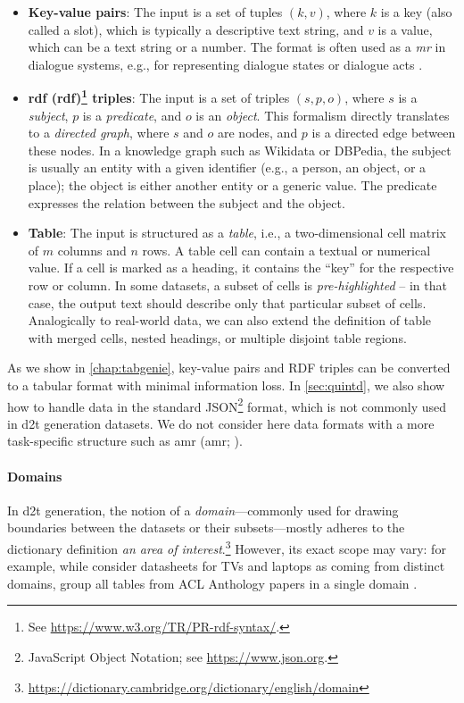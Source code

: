 {\begin{itemize}
    \item \textbf{Key-value pairs}: The input is a set of tuples $(k, v)$, where $k$ is a key (also called a slot), which is typically a descriptive text string, and $v$ is a value, which can be a text string or a number. The format is often used as a \emph{\ac{mr}} in dialogue systems, e.g., for representing dialogue states or dialogue acts \cite{rastogiScalableMultiDomainConversational2020,budzianowskiMultiWOZLargeScaleMultiDomain2020}.
    \item \textbf{\acs{rdf} (\Acl{rdf})\footnote{See \url{https://www.w3.org/TR/PR-rdf-syntax/}.} triples}: The input is a set of triples $(s, p, o)$, where $s$ is a \emph{subject},  $p$ is a \emph{predicate}, and $o$ is an \textit{object}. This formalism directly translates to a \emph{directed graph}, where $s$ and $o$ are nodes, and $p$ is a directed edge between these nodes. In a knowledge graph such as Wikidata or DBPedia, the subject is usually an entity with a given identifier (e.g., a person, an object, or a place); the object is either another entity or a generic value. The predicate expresses the relation between the subject and the object.
    \item \textbf{Table}: The input is structured as a \textit{table}, i.e., a two-dimensional cell matrix of $m$ columns and $n$ rows. A table cell can contain a textual or numerical value. If a cell is marked as a heading, it contains the ``key'' for the respective row or column. In some datasets, a subset of cells is \emph{pre-highlighted} -- in that case, the output text should describe only that particular subset of cells. Analogically to real-world data, we can also extend the definition of table with merged cells, nested headings, or multiple disjoint table regions.
\end{itemize}

As we show in \autoref{chap:tabgenie}, key-value pairs and RDF triples can be converted to a tabular format with minimal information loss. In \autoref{sec:quintd}, we also show how to handle data in the standard JSON\footnote{JavaScript Object Notation; see \url{https://www.json.org}.} format, which is not commonly used in \ac{d2t} generation datasets. We do not consider here data formats with a more task-specific structure such as \acl{amr} (\acs{amr}; \citealp{banarescu2013abstract}).

\paragraph{Domains} In \ac{d2t} generation, the notion of a \emph{domain}---commonly used for drawing boundaries between the datasets or their subsets---mostly adheres to the dictionary definition \emph{an area of interest}.\footnote{\url{https://dictionary.cambridge.org/dictionary/english/domain}} However, its exact scope may vary: for example, while \citet{wen2016multi} consider datasheets for TVs and laptops as coming from distinct domains, \citet{lin2023survey} group all tables from ACL Anthology papers in a single domain \cite{suadaaTabletoTextGenerationNumerical2021}.

}
